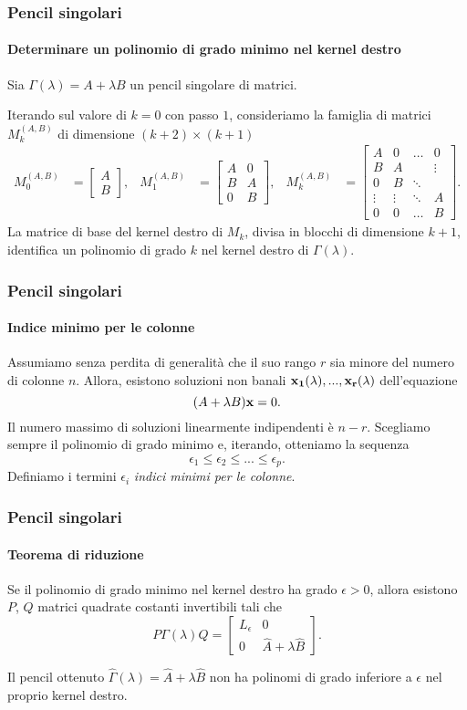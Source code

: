\begin{frame}
	\frametitle{Pencil singolari}
	\framesubtitle{Determinare un polinomio di grado minimo nel kernel destro}
	Sia \(\Gamma(\lambda)=A+\lambda B\) un pencil singolare di matrici.

	Iterando sul valore di $k = 0$ con passo $1$, consideriamo la famiglia di matrici
	$M_k^{(A, B)}$ di dimensione $(k+2) \times (k+1)$
	\begin{align*}
		M_{0}^{(A, B)} &=
			\left[\begin{smallmatrix}
				A \\
				B
			\end{smallmatrix}\right],
		& M_{1}^{(A, B)} &=
			\left[\begin{smallmatrix}
				A & 0 \\
				B & A \\
				0 & B
			\end{smallmatrix}\right],
		& M_{k}^{(A, B)} &=
			\left[\begin{smallmatrix}
				A & 0 & \hdots &    0   \\
				B & A &        & \vdots \\
				0 & B & \ddots & \\
				\vdots & \vdots & \ddots & A \\
				0      &    0   & \hdots & B
			\end{smallmatrix}\right].
	\end{align*}
	\onslide<2-> La matrice di base del kernel destro di $M_k$, divisa in blocchi di
	dimensione $k+1$, identifica un polinomio di grado $k$ nel kernel destro di
	$\Gamma(\lambda)$.
\end{frame}


\begin{frame}
	\frametitle{Pencil singolari}
	\framesubtitle{Indice minimo per le colonne}
	Assumiamo senza perdita
	di generalit\`a che il suo rango $r$ sia minore del numero di colonne $n$. Allora,
	esistono soluzioni non banali $\vb{x_1}(\lambda), ..., \vb{x_r}(\lambda)$ dell'equazione
	\[
		(A+\lambda B)\vb{x} = 0.
	\]
	\onslide<2-> Il numero massimo di soluzioni linearmente indipendenti \`e $n-r$. Scegliamo
	sempre il polinomio di grado minimo e, iterando, otteniamo la sequenza
	\[
		\epsilon_{1} \leq \epsilon_{2} \leq ... \leq \epsilon_{p}.
	\]
	Definiamo i termini $\epsilon_i$ \emph{indici minimi per le colonne}.
\end{frame}


\begin{frame}
	\frametitle{Pencil singolari}
	\framesubtitle{Teorema di riduzione}
	\begin{theorem}
		Se il polinomio di grado minimo nel kernel destro ha grado $\epsilon > 0$, allora esistono
		$P$, $Q$ matrici quadrate costanti invertibili tali che
		\[
			P\Gamma(\lambda)Q=\begin{bmatrix}
				L_{\epsilon} & 0 \\
				0 & \widehat{A} + \lambda \widehat{B}
			\end{bmatrix}.
		\]
	\end{theorem}
	 Il pencil ottenuto $\widehat{\Gamma}(\lambda) = \widehat{A} + \lambda \widehat{B}$
	non ha polinomi di grado inferiore a $\epsilon$ nel proprio kernel destro.
\end{frame}